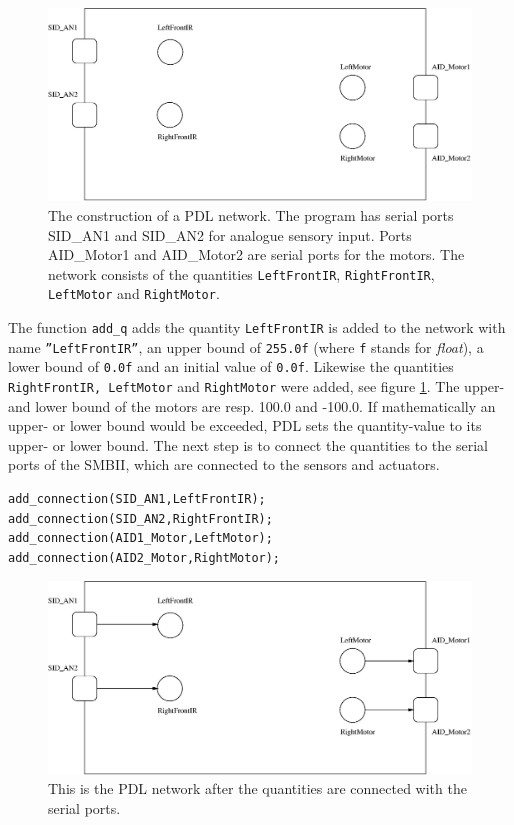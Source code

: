 \begin{figure}
\centerline{\includegraphics[width=12cm]{robots//pdl_networka.eps}}
\caption{The construction of a PDL network. The program has serial ports SID\_AN1 and SID\_AN2 for analogue sensory input. Ports AID\_Motor1 and AID\_Motor2 are serial ports for the motors. The network consists of the quantities \texttt{LeftFrontIR}, \texttt{RightFrontIR}, \texttt{LeftMotor} and \texttt{RightMotor}.}
\label{f:robots:pdl_networka}
\end{figure}

\bigskip\noindent
The function \texttt{add\_q} adds the quantity \texttt{LeftFrontIR} is added to the network with name \texttt{''LeftFrontIR''}, an upper bound of \texttt{255.0f} (where \texttt{f} stands for {\em float}), a lower bound of \texttt{0.0f} and an initial value of \texttt{0.0f}. Likewise the quantities \texttt{RightFrontIR, LeftMotor} and \texttt{RightMotor} were added, see figure \ref{f:robots:pdl_networka}. The upper- and lower bound of the motors are resp. 100.0 and -100.0. If mathematically an upper- or lower bound would be exceeded, PDL sets the quantity-value to its upper- or lower bound. The next step is to connect the quantities to the serial ports of the SMBII, which are connected to the sensors and actuators.


{\footnotesize\begin{verbatim}
add_connection(SID_AN1,LeftFrontIR);
add_connection(SID_AN2,RightFrontIR);
add_connection(AID1_Motor,LeftMotor);
add_connection(AID2_Motor,RightMotor);
\end{verbatim}}

\begin{figure}
\centerline{\includegraphics[width=12cm]{robots//pdl_networkb.eps}}
\caption{This is the PDL network after the quantities are connected with the serial ports.}
\label{f:robots:pdl_networkb}
\end{figure}



